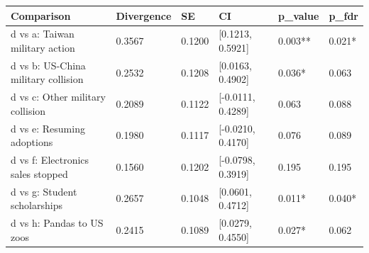 
\begin{tabular}[t]{llllll}
\toprule
Comparison & Divergence & SE & CI & p\_value & p\_fdr\\
\midrule
d vs a: Taiwan military action & 0.3567 & 0.1200 & {}[0.1213, 0.5921] & 0.003** & 0.021*\\
d vs b: US-China military collision & 0.2532 & 0.1208 & {}[0.0163, 0.4902] & 0.036* & 0.063\\
d vs c: Other military collision & 0.2089 & 0.1122 & {}[-0.0111, 0.4289] & 0.063 & 0.088\\
d vs e: Resuming adoptions & 0.1980 & 0.1117 & {}[-0.0210, 0.4170] & 0.076 & 0.089\\
d vs f: Electronics sales stopped & 0.1560 & 0.1202 & {}[-0.0798, 0.3919] & 0.195 & 0.195\\
d vs g: Student scholarships & 0.2657 & 0.1048 & {}[0.0601, 0.4712] & 0.011* & 0.040*\\
d vs h: Pandas to US zoos & 0.2415 & 0.1089 & {}[0.0279, 0.4550] & 0.027* & 0.062\\
\bottomrule
\end{tabular}
